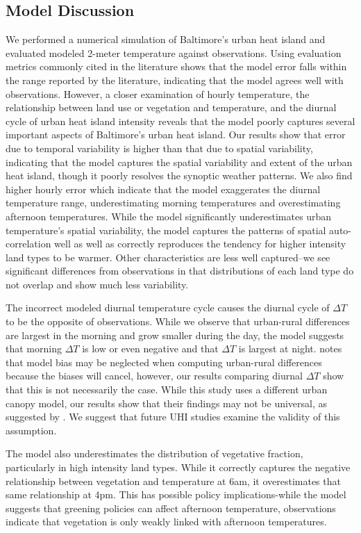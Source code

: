 \subsection{Model Discussion}
We performed a numerical simulation of Baltimore's urban heat island and evaluated modeled 2-meter temperature against observations. 
Using evaluation metrics commonly cited in the literature shows that the model error falls within the range reported by the literature, indicating that the model agrees well with observations. 
However, a closer examination of hourly temperature, the relationship between land use or vegetation and temperature, and the diurnal cycle of urban heat island intensity reveals that the model poorly captures several important aspects of Baltimore's urban heat island. 
Our results show that error due to temporal variability is higher than that due to spatial variability, indicating that the model captures the spatial variability and extent of the urban heat island, though it poorly resolves the synoptic weather patterns. We also find higher hourly error which indicate that the model exaggerates the diurnal temperature range, underestimating morning temperatures and overestimating afternoon temperatures. 
While the model significantly underestimates urban temperature's spatial variability, the model captures the patterns of spatial auto-correlation well as well as correctly reproduces the tendency for higher intensity land types to be warmer. Other characteristics are less well captured--we see significant differences from observations in that distributions of each land type do not overlap and show much less variability. 

 The incorrect modeled diurnal temperature cycle causes the diurnal cycle of $\Delta T$ to be the opposite of observations. While we observe that urban-rural differences are largest in the morning and grow smaller during the day, the model suggests that morning $\Delta T$ is low or even negative and that $\Delta T$ is largest at night. \cite{lisynergistic2003} notes that model bias may be neglected when computing urban-rural differences because the biases will cancel, however, our results comparing diurnal $\Delta T$  show that this is not necessarily the case. While this study uses a different urban canopy model, our results show that their findings may not be universal, as suggested by \cite{scott2018reduced}.  We suggest that future UHI studies examine the validity of this assumption. 

The model also underestimates the distribution of vegetative fraction, particularly in high intensity land types. While it correctly captures the negative relationship between vegetation and temperature at 6am, it overestimates that same relationship at 4pm. This has possible policy implications-while the model suggests that greening policies can affect afternoon temperature, observations indicate that vegetation is only weakly linked with afternoon temperatures.
% 

